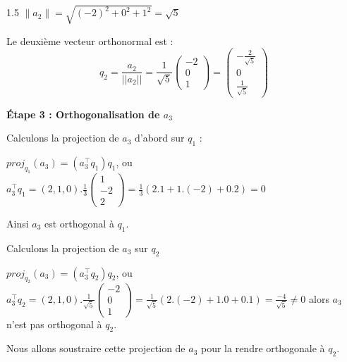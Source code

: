\documentclass[12pt]{article}
\begin{document}
\begin{spacing}{1.5}
$\parallel a_2\parallel =\sqrt{(-2)^2+0^2+1^2}=\sqrt{5}$

Le deuxième vecteur orthonormal est :
\[q_2=\frac{a_2}{\vert\vert a_2\vert\vert}=\frac{1}{\sqrt{5}}\begin{pmatrix}
-2\\
0\\
1
\end{pmatrix}=\begin{pmatrix}
-\frac{2}{\sqrt{5}}\\
0\\
\frac{1}{\sqrt{5}}
\end{pmatrix}\]

\medskip
\textbf{Étape 3 : Orthogonalisation de $a_3$}

Calculons la projection de $a_3$ d'abord sur $q_1$ :

$proj_{q_1}(a_3)=(a_3^{\intercal}q_1)q_1$, ou $a_3^{\intercal}q_1=(2, 1,0).\frac{1}{3}\begin{pmatrix}
1\\
-2\\
2
\end{pmatrix}=\frac{1}{3}(2.1+1.(-2)+0.2)=0$

Ainsi $a_3$ est orthogonal à $q_1$.

\medskip
Calculons la projection de $a_3$  sur $q_2$ 

$proj_{q_2}(a_3)=(a_3^{\intercal}q_2)q_2$, ou $a_3^{\intercal}q_2=(2, 1,0).\frac{1}{\sqrt{5}}\begin{pmatrix}
-2\\
0\\
1
\end{pmatrix}=\frac{1}{\sqrt{5}}(2.(-2)+1.0+0.1)=\frac{-4}{\sqrt{5}}\neq 0$ alors $a_3$ n'est pas orthogonal à $q_2$.

Nous allons soustraire cette projection de $a_3$ pour la rendre orthogonale à $q_2$.


\end{spacing}
\end{document}

